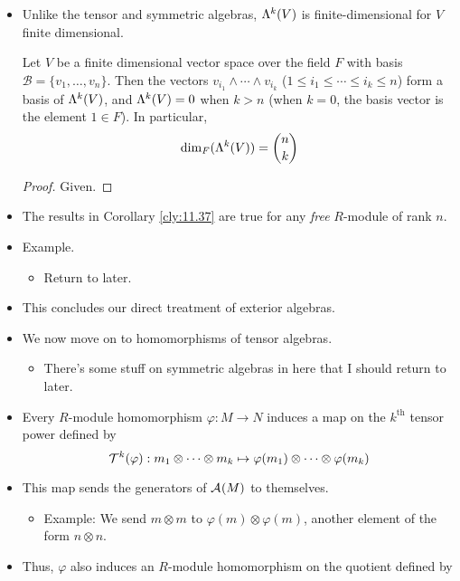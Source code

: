 \documentclass[../notes.tex]{subfiles}
\begin{document}
\begin{itemize}
    \item Unlike the tensor and symmetric algebras, $\lam[k]{V}$ is finite-dimensional for $V$ finite dimensional.
    \begin{corollary}\label{cly:11.37}
        Let $V$ be a finite dimensional vector space over the field $F$ with basis $\mathcal{B}=\{v_1,\dots,v_n\}$. Then the vectors $v_{i_1}\wedge\cdots\wedge v_{i_k}$ ($1\leq i_1\leq\cdots\leq i_k\leq n$) form a basis of $\lam[k]{V}$, and $\lam[k]{V}=0$ when $k>n$ (when $k=0$, the basis vector is the element $1\in F$). In particular,
        \begin{equation*}
            \dim_F(\lam[k]{V}) = \binom{n}{k}
        \end{equation*}
        \begin{proof}
            Given.
        \end{proof}
    \end{corollary}
    \item The results in Corollary \ref{cly:11.37} are true for any \emph{free} $R$-module of rank $n$.
    \item Example.
    \begin{itemize}
        \item Return to later.
    \end{itemize}
    \item This concludes our direct treatment of exterior algebras.
    \item We now move on to homomorphisms of tensor algebras.
    \begin{itemize}
        \item There's some stuff on symmetric algebras in here that I should return to later.
    \end{itemize}
    \item Every $R$-module homomorphism $\varphi:M\to N$ induces a map on the $k^\text{th}$ tensor power defined by
    \begin{equation*}
        \ten[k]{\varphi}:m_1\otimes\cdots\otimes m_k\mapsto\varphi(m_1)\otimes\cdots\otimes\varphi(m_k)
    \end{equation*}
    \item This map sends the generators of $\alt{M}$ to themselves.
    \begin{itemize}
        \item Example: We send $m\otimes m$ to $\varphi(m)\otimes\varphi(m)$, another element of the form $n\otimes n$.
    \end{itemize}
    \item Thus, $\varphi$ also induces an $R$-module homomorphism on the quotient defined by

\end{itemize}
\end{document}
